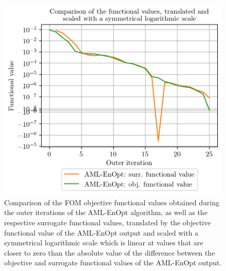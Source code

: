 \begin{figure}
\centering
\includegraphics{Plots/reducedFunctionalValueCompSymlog.png}
\caption{\label{AMLEnOptFuncValCompSymlog}Comparison of the FOM objective functional values obtained during the outer iterations of the AML-EnOpt algorithm, as well as the respective surrogate functional values, translated by the objective functional value of the AML-EnOpt output and scaled with a symmetrical logarithmic scale which is linear at values that are closer to zero than the absolute value of the difference between the objective and surrogate functional values of the AML-EnOpt output.}
\end{figure}

